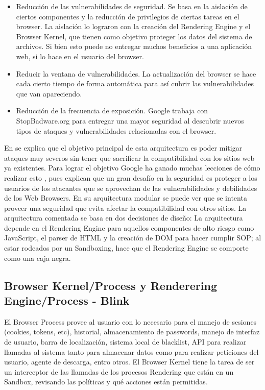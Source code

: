     \begin{itemize}
    	\item Reducción de las vulnerabilidades de seguridad. Se basa en la aislación de ciertos componentes y la reducción de privilegios de ciertas tareas en el browser. La aislación lo lograron con la creación del Rendering Engine y el Browser Kernel, que tienen como objetivo proteger los datos del sistema de archivos. Si bien esto puede no entregar muchos beneficios a una aplicación web, si lo hace en el usuario del browser.
    	\item Reducir la ventana de vulnerabilidades. La actualización del browser se hace cada cierto tiempo de forma automática para así cubrir las vulnerabilidades que van apareciendo.
    	\item Reducción de la frecuencia de exposición. Google trabaja con StopBadware.org para entregar una mayor seguridad al descubrir nuevos tipos de ataques y vulnerabilidades relacionadas con el browser.
    \end{itemize}

    En \cite{barth2008security} se explica que el objetivo principal de esta arquitectura es poder mitigar ataques muy severos sin tener que sacrificar la compatibilidad con los sitios web ya existentes. Para lograr el objetivo Google ha ganado muchas lecciones de cómo realizar esto \cite{reis2009browser}, pues explican que un gran desafío en la seguridad es proteger a los usuarios de los atacantes que se aprovechan de las vulnerabilidades y debilidades de los Web Browsers. En su arquitectura modular se puede ver que se intenta proveer una seguridad que evita afectar la compatibilidad con otros sitios. La arquitectura comentada se basa en dos decisiones de diseño: La arquitectura depende en el Rendering Engine para aquellos componentes de alto riesgo como JavaScript, el parser de HTML y la creación de DOM para hacer cumplir SOP; al estar rodeados por un Sandboxing, hace que el Rendering Engine se comporte como una caja negra. 

 \subsection{Browser Kernel/Process y Renderering Engine/Process - Blink}
    El Browser Process provee al usuario con lo necesario para el manejo de sesiones (cookies, tokens, etc), historial, almacenamiento de passwords, manejo de interfaz de usuario, barra de localización, sistema local de blacklist, API para realizar llamadas al sistema tanto para almacenar datos como para realizar peticiones del usuario, agente de descarga, entro otros. El Browser Kernel tiene la tarea de ser un interceptor de las llamadas de los procesos Rendering que están en un Sandbox, revisando las políticas y qué acciones están permitidas.

